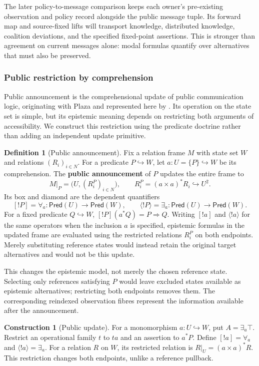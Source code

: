 \documentclass[11pt,a4paper]{article}
\numberwithin{equation}{section}
\theoremstyle{definition}
\newtheorem{definition}[theorem]{Definition}
\newtheorem{construction}[construction]{Construction}
\theoremstyle{remark}
\theoremstyle{plain}
\begin{document}
The later policy-to-message comparison keeps each owner's
pre-existing observation and policy record alongside the public message
tuple. Its forward map and source-fixed lifts will transport knowledge,
distributed knowledge, coalition deviations, and the specified fixed-point
assertions. This is stronger than agreement on current messages alone:
modal formulas quantify over alternatives that must also be preserved.

\subsubsection{Public restriction by comprehension}
\label{sec:egt-dynamic-update}

Public announcement is the comprehensional update of public
communication logic, originating with Plaza and represented here by
\citet{Plaza2007PublicCommunications}. Its operation on the state set
is simple, but its epistemic meaning depends on restricting both
arguments of accessibility. We construct this restriction using the
predicate doctrine rather than adding an independent update primitive.

\begin{definition}[Public announcement]
\label{def:egt-public-announcement}
Fix a relation frame $M$ with state set $W$ and relations
$(R_i)_{i\in N}$. For a predicate $P\hookrightarrow W$, let
$a:U=\{P\}\hookrightarrow W$ be its comprehension. The \textbf{public announcement} of $P$ updates the
entire frame to
\[
 M|_P=\bigl(U,(R_i^P)_{i\in N}\bigr),\qquad
 R_i^P=(a\times a)^*R_i\hookrightarrow U^2.
\]
Its box and diamond are the dependent quantifiers
\[
 [!P]=\forall_a:\mathsf{Pred}(U)\to\mathsf{Pred}(W),\qquad
 \langle!P\rangle=\exists_a:\mathsf{Pred}(U)\to\mathsf{Pred}(W).
\]
For a fixed predicate $Q\hookrightarrow W$,
$[!P](a^*Q)=P\Rightarrow Q$. Writing $[!a]$ and
$\langle!a\rangle$ for the same operators when the inclusion $a$
is specified, epistemic formulas in the updated frame are evaluated
using the restricted relations $R_i^P$ on both endpoints.
Merely substituting reference states would instead retain the original
target alternatives and would not be this update.
\end{definition}
This changes the epistemic model, not merely the chosen reference
state. Selecting only references satisfying $P$ would leave excluded
states available as epistemic alternatives; restricting both endpoints
removes them. The corresponding reindexed observation fibres represent
the information available after the announcement.
\begin{construction}[Public update]
For a monomorphism $a:U\hookrightarrow W$, put $A=\exists_a\top$.
Restrict an operational family $t$ to $ta$ and an assertion to $a^*P$.
Define $[!a]=\forall_a$ and $\langle!a\rangle=\exists_a$.
For a relation $R$ on $W$, its restricted relation is
$R|_U=(a\times a)^*R$.
This restriction changes both endpoints, unlike a reference pullback.
\end{construction}
\end{document}
